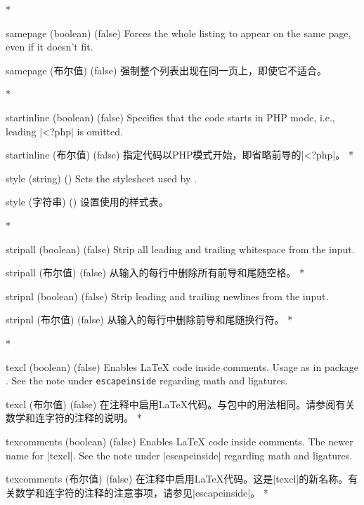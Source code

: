 \begin{optionlist}
\begin{paracol}{2}
\switchcolumn[0]*%
  \item[samepage (boolean) (false)]
    Forces the whole listing to appear on the same page, even if it doesn't fit.
    \switchcolumn
    \item[samepage (布尔值) (false)]
    强制整个列表出现在同一页上，即使它不适合。

\switchcolumn[0]*%

  \item[startinline (boolean) (false)] 
    Specifies that the code starts in PHP mode, i.e., leading |<?php| is omitted.
    \switchcolumn
    \item[startinline (布尔值) (false)] 
    指定代码以PHP模式开始，即省略前导的|<?php|。
\switchcolumn[0]*%
  \item[style] (string) ()
    Sets the stylesheet used by .
    \switchcolumn
    \item[style] (字符串) ()
    设置使用的样式表。


\switchcolumn[0]*%

  \item[stripall (boolean) (false)]
    Strip all leading and trailing whitespace from the input.
    \switchcolumn
    \item[stripall (布尔值) (false)]
    从输入的每行中删除所有前导和尾随空格。
\switchcolumn[0]*%
  \item[stripnl (boolean) (false)]
    Strip leading and trailing newlines from the input.
    \switchcolumn
    \item[stripnl (布尔值) (false)]
    从输入的每行中删除前导和尾随换行符。
    \switchcolumn[0]*%

\switchcolumn[0]*%
  \item[texcl (boolean) (false)]
    Enables \LaTeX{} code inside comments.
    Usage as in package .  See the note under \texttt{escapeinside} regarding math and ligatures.
    \switchcolumn
    \item[texcl (布尔值) (false)]
    在注释中启用\LaTeX{}代码。与包中的用法相同。请参阅有关数学和连字符的注释的说明。
\switchcolumn[0]*%
  \item[texcomments (boolean) (false)]
    Enables \LaTeX{} code inside comments.  The newer name for |texcl|.  See the note under |escapeinside| regarding math and ligatures.
    \switchcolumn
    \item[texcomments (布尔值) (false)]
    在注释中启用\LaTeX{}代码。这是|texcl|的新名称。有关数学和连字符的注释的注意事项，请参见|escapeinside|。
\switchcolumn[0]*%


\end{paracol}
\end{optionlist}
